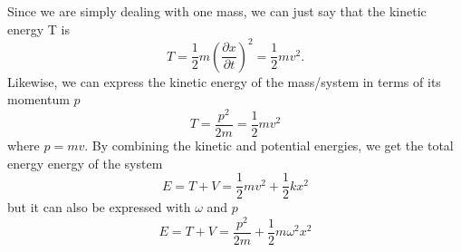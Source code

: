 \documentclass{article}
\newcommand{\be}{\begin{equation}}
\newcommand{\ee}{\end{equation}}
\begin{document}
Since we are simply dealing with one mass, we can just say that the kinetic energy T is
\be
T = \frac{1}{2}m (\frac{\partial x}{\partial t})^2 = \frac{1}{2}m v^2.
\ee
Likewise, we can express the kinetic energy of the mass/system in terms of its momentum $p$
\be
T = \frac{p^2}{2 m} = \frac{1}{2} m v^2
\ee
where $p = mv$. By combining the kinetic and potential energies, we get the total energy energy of the system
\be
E = T + V = \frac{1}{2}mv^2 + \frac{1}{2}kx^2
\ee
but it can also be expressed with $\omega$ and $p$
\be
E = T + V = \frac{p^2}{2 m} + \frac{1}{2}m  \omega^2 x^2
\ee
\end{document}
